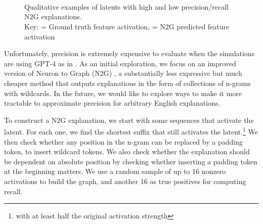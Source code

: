 \begin{figure}[t]
\begin{multicols}{2}
\hlc[ffffff]{=}\hlc[ffffff]{|}\hlc[ffffff]{\&}\hlc[ffffff]{=}\hlc[ffffff]{\&}\hlc[ffffff]{=}\hlc[ffffff]{\&}\\[8pt] 
\hlc[ffffff]{=}\hlc[ffffff]{|}\hlc[ffffff]{\&}\hlc[ffffff]{=}\hlc[ffffff]{\&}\hlc[ffffff]{=}\hlc[ffffff]{\&}\\[8pt] 
\hlc[ffffff]{=}\hlc[ffffff]{|}\hlc[ffffff]{\&}\hlc[ffffff]{=}\hlc[ffffff]{\&}\hlc[ffffff]{=}\hlc[ffffff]{\&}\\[8pt] 
\endgroup 
\end{multicols}

    \caption{Qualitative examples of latents with high and low precision/recall N2G explanations.\\
    Key:  = Ground truth feature activation,  = N2G predicted feature activation}
    \label{fig:n2g_examples}
\end{figure}


Unfortunately, precision is extremely expensive to evaluate when the simulations are using GPT-4 as in \citet{bills2023language}. As an initial exploration, we focus on an improved version of Neuron to Graph (N2G) \citep{foote2023neuron}, a substantially less expressive but much cheaper method that outputs explanations in the form of collections of n-grams with wildcards.
In the future, we would like to explore ways to make it more tractable to approximate precision for arbitrary English explanations. %

To construct a N2G explanation, we start with some sequences that activate the latent. For each one, we find the shortest suffix that still activates the latent.\footnote{with at least half the original activation strength} We then check whether any position in the n-gram can be replaced by a padding token, to insert wildcard tokens. We also check whether the explanation should be dependent on absolute position by checking whether inserting a padding token at the beginning matters.
We use a random sample of up to 16 nonzero activations to build the graph, and another 16 as true positives for computing recall.  %

